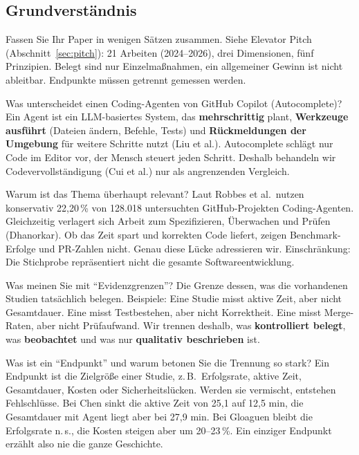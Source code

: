 \documentclass[12pt,a4paper]{article}
\begin{document}
\subsection{Grundverständnis}

\begin{qa}{Fassen Sie Ihr Paper in wenigen Sätzen zusammen.}
Siehe Elevator Pitch (Abschnitt~\ref{sec:pitch}): 21 Arbeiten (2024--2026), drei Dimensionen, fünf Prinzipien. Belegt sind nur Einzelmaßnahmen, ein allgemeiner Gewinn ist nicht ableitbar. Endpunkte müssen getrennt gemessen werden.
\end{qa}

\begin{qa}{Was unterscheidet einen Coding-Agenten von GitHub Copilot (Autocomplete)?}
Ein Agent ist ein LLM-basiertes System, das \textbf{mehrschrittig} plant, \textbf{Werkzeuge ausführt} (Dateien ändern, Befehle, Tests) und \textbf{Rückmeldungen der Umgebung} für weitere Schritte nutzt (Liu et al.). Autocomplete schlägt nur Code im Editor vor, der Mensch steuert jeden Schritt. Deshalb behandeln wir Codevervollständigung (Cui et al.) nur als angrenzenden Vergleich.
\end{qa}

\begin{qa}{Warum ist das Thema überhaupt relevant?}
Laut Robbes et al.\ nutzen konservativ 22,20\,\% von 128.018 untersuchten GitHub-Projekten Coding-Agenten. Gleichzeitig verlagert sich Arbeit zum Spezifizieren, Überwachen und Prüfen (Dhanorkar). Ob das Zeit spart und korrekten Code liefert, zeigen Benchmark-Erfolge und PR-Zahlen nicht. Genau diese Lücke adressieren wir. Einschränkung: Die Stichprobe repräsentiert nicht die gesamte Softwareentwicklung.
\end{qa}

\begin{qa}{Was meinen Sie mit \enquote{Evidenzgrenzen}?}
Die Grenze dessen, was die vorhandenen Studien tatsächlich belegen. Beispiele: Eine Studie misst aktive Zeit, aber nicht Gesamtdauer. Eine misst Testbestehen, aber nicht Korrektheit. Eine misst Merge-Raten, aber nicht Prüfaufwand. Wir trennen deshalb, was \textbf{kontrolliert belegt}, was \textbf{beobachtet} und was nur \textbf{qualitativ beschrieben} ist.
\end{qa}

\begin{qa}{Was ist ein \enquote{Endpunkt} und warum betonen Sie die Trennung so stark?}
Ein Endpunkt ist die Zielgröße einer Studie, z.\,B.\ Erfolgsrate, aktive Zeit, Gesamtdauer, Kosten oder Sicherheitslücken. Werden sie vermischt, entstehen Fehlschlüsse. Bei Chen sinkt die aktive Zeit von 25,1 auf 12,5 min, die Gesamtdauer mit Agent liegt aber bei 27,9 min. Bei Gloaguen bleibt die Erfolgsrate n.\,s., die Kosten steigen aber um 20--23\,\%. Ein einziger Endpunkt erzählt also nie die ganze Geschichte.
\end{qa}
\end{document}
